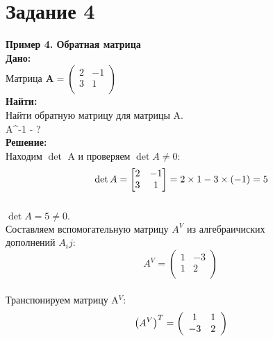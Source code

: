 \documentclass[a4paper,12pt]{article} %
\begin{document}
\newpage

\section{Задание 4}
\textbf{Пример 4. Обратная матрица} \\
\small{\textbf{Дано:}} \\
Матрица $\mathbf{A} =
\left( \begin{array}{cc}
2 & -1  \\
3 & 1 \\
\end{array} \right)$ \\

\small{\textbf{Найти:}} \\
Найти обратную матрицу для матрицы A.\\
A^{-1} - ? \\

\small{\textbf{Решение:}} \\

Находим $\det$ A и проверяем $\det A \neq 0$:
\begin{displaymath}
\\
\det A = \begin{bmatrix}
2 & -1\\
3 & 1 \\
\end{bmatrix} = 2 \times 1 - 3 \times (-1) = 5
\end{displaymath}\\

\footnotesize{$\det A = 5 \neq 0.$}\\

Составляем вспомогательную матрицу $A^{V}$ из алгебраичиских\\
дополнений $A_{i}{j}$:
\begin{displaymath}
    A^{V} = \left(\begin{array}{cc}
    1 & -3  \\
    1 & 2 \\
  \end{array} \right)
\end{displaymath}\\
Транспонируем матрицу A$^{V}$:
\begin{displaymath}
\\
    \left(A^{V} \right)^{T}  = \left(\begin{array}{cc}
    1 & 1  \\
    -3 & 2 \\
  \end{array} \right)
\end{displaymath} \\
\end{document}
